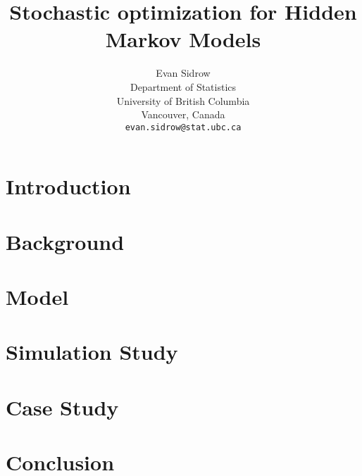 \documentclass{article}
\title{Stochastic optimization for Hidden Markov Models}
\author{
  Evan Sidrow \\
  Department of Statistics\\
  University of British Columbia\\
  Vancouver, Canada \\
  \texttt{evan.sidrow@stat.ubc.ca} \\
}
\begin{document}
\maketitle


\section{Introduction}


\section{Background}


\section{Model}


\section{Simulation Study}


\section{Case Study}


\section{Conclusion}


\newpage

\scriptsize

\end{document}
